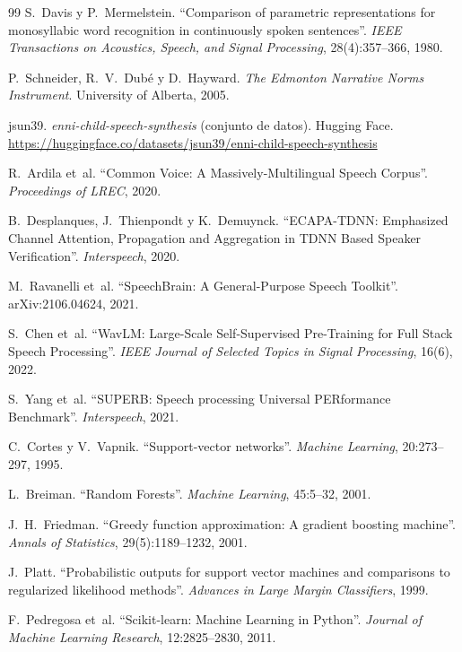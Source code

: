 \documentclass[11pt,a4paper]{article}
\begin{document}
\begin{thebibliography}{99}
 S.~Davis y P.~Mermelstein. ``Comparison of parametric representations for monosyllabic word recognition in continuously spoken sentences''. \emph{IEEE Transactions on Acoustics, Speech, and Signal Processing}, 28(4):357--366, 1980.

 P.~Schneider, R.~V.~Dubé y D.~Hayward. \emph{The Edmonton Narrative Norms Instrument}. University of Alberta, 2005.

 jsun39. \emph{enni-child-speech-synthesis} (conjunto de datos). Hugging Face. \url{https://huggingface.co/datasets/jsun39/enni-child-speech-synthesis}

 R.~Ardila et~al. ``Common Voice: A Massively-Multilingual Speech Corpus''. \emph{Proceedings of LREC}, 2020.

 B.~Desplanques, J.~Thienpondt y K.~Demuynck. ``ECAPA-TDNN: Emphasized Channel Attention, Propagation and Aggregation in TDNN Based Speaker Verification''. \emph{Interspeech}, 2020.

 M.~Ravanelli et~al. ``SpeechBrain: A General-Purpose Speech Toolkit''. arXiv:2106.04624, 2021.

 S.~Chen et~al. ``WavLM: Large-Scale Self-Supervised Pre-Training for Full Stack Speech Processing''. \emph{IEEE Journal of Selected Topics in Signal Processing}, 16(6), 2022.

 S.~Yang et~al. ``SUPERB: Speech processing Universal PERformance Benchmark''. \emph{Interspeech}, 2021.

 C.~Cortes y V.~Vapnik. ``Support-vector networks''. \emph{Machine Learning}, 20:273--297, 1995.

 L.~Breiman. ``Random Forests''. \emph{Machine Learning}, 45:5--32, 2001.

 J.~H.~Friedman. ``Greedy function approximation: A gradient boosting machine''. \emph{Annals of Statistics}, 29(5):1189--1232, 2001.

 J.~Platt. ``Probabilistic outputs for support vector machines and comparisons to regularized likelihood methods''. \emph{Advances in Large Margin Classifiers}, 1999.

 F.~Pedregosa et~al. ``Scikit-learn: Machine Learning in Python''. \emph{Journal of Machine Learning Research}, 12:2825--2830, 2011.

\end{thebibliography}
\end{document}
